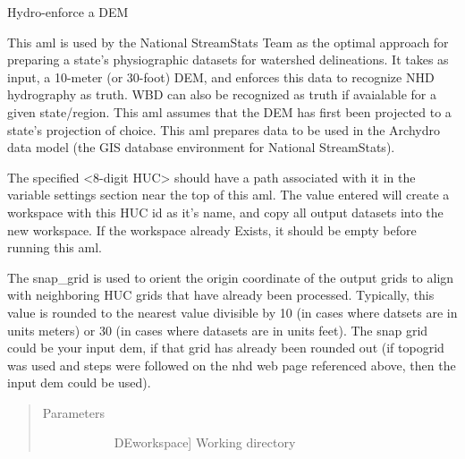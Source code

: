 \documentclass[letterpaper,10pt,english]{sphinxmanual}
\begin{document}

\begin{fulllineitems}
\label{\detokenize{make_hydrodem:make_hydrodem.hydrodem}}
Hydro-enforce a DEM

This aml is used by the National StreamStats Team as the optimal
approach for preparing a state’s physiographic datasets for watershed delineations.
It takes as input, a 10-meter (or 30-foot) DEM, and enforces this data to recognize
NHD hydrography as truth.  WBD can also be recognized as truth if avaialable for a
given state/region. This aml assumes that the DEM has first been projected to a
state’s projection of choice. This aml prepares data to be used in the Archydro
data model (the GIS database environment for National StreamStats).

The specified \textless{}8-digit HUC\textgreater{} should have a path associated with it in the variable 
settings section near the top of this aml.  The value entered will create a workspace
with this HUC id as it’s name, and copy all output datasets into the new workspace.
If the workspace already Exists, it should be empty before running this aml.

The snap\_grid is used to orient the origin coordinate of the output grids to align 
with neighboring HUC grids that have already been processed.  
Typically, this value is rounded to the nearest value
divisible by 10 (in cases where datsets are in units meters) or 30 (in cases where
datasets are in units feet).  The snap grid could be your input dem, if that grid
has already been rounded out (if topogrid was used and steps were followed on the 
nhd web page referenced above, then the input dem could be used).
\begin{quote}\begin{description}
\item[{Parameters}] \leavevmode\begin{description}
\item[{}] \leavevmode{[}DEworkspace{]}
Working directory


\end{description}
\end{description}
\end{quote}
\end{fulllineitems}
\end{document}

